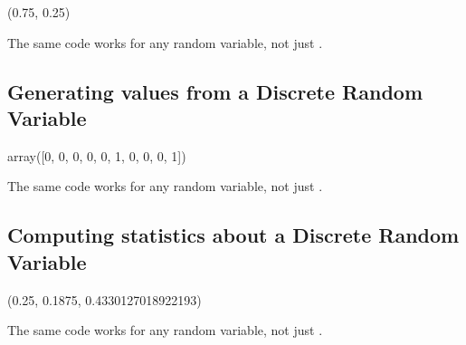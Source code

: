 \documentclass[letterpaper,10pt,english]{jupyterBook}
\begin{document}
\begin{sphinxVerbatim}[commandchars=\\\{\}]
(0.75, 0.25)
\end{sphinxVerbatim}

\sphinxAtStartPar
The same code works for any random variable, not just .


\subsection{Generating values from a Discrete Random Variable}
\label{\detokenize{GB213-review-in-Python:generating-values-from-a-discrete-random-variable}}
\begin{sphinxVerbatim}[commandchars=\\\{\}]
    
\end{sphinxVerbatim}

\begin{sphinxVerbatim}[commandchars=\\\{\}]
array([0, 0, 0, 0, 0, 1, 0, 0, 0, 1])
\end{sphinxVerbatim}

\sphinxAtStartPar
The same code works for any random variable, not just .


\subsection{Computing statistics about a Discrete Random Variable}
\label{\detokenize{GB213-review-in-Python:computing-statistics-about-a-discrete-random-variable}}
\begin{sphinxVerbatim}[commandchars=\\\{\}]
    
\end{sphinxVerbatim}

\begin{sphinxVerbatim}[commandchars=\\\{\}]
(0.25, 0.1875, 0.4330127018922193)
\end{sphinxVerbatim}

\sphinxAtStartPar
The same code works for any random variable, not just .
\end{document}
